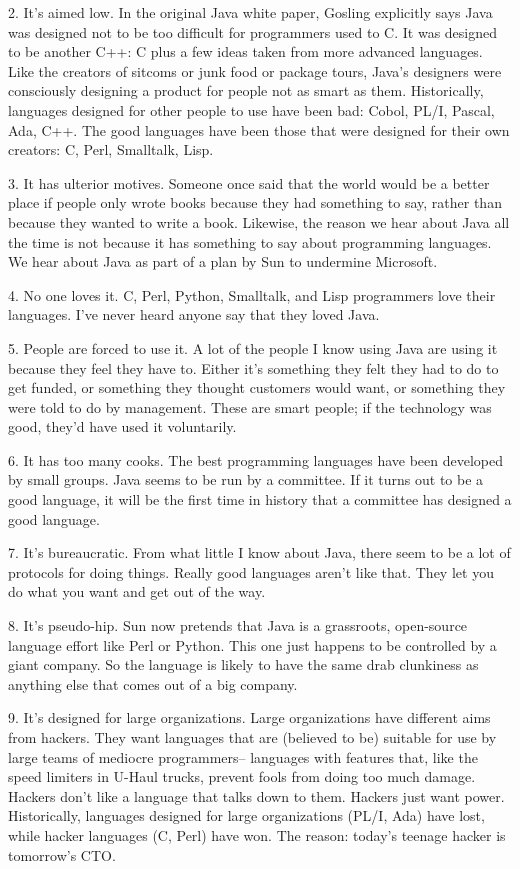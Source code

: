 2. It's aimed low. In the original Java white paper, Gosling explicitly
says Java was designed not to be too difficult for programmers used to
C. It was designed to be another C++: C plus a few ideas taken from more
advanced languages. Like the creators of sitcoms or junk food or package
tours, Java's designers were consciously designing a product for people
not as smart as them. Historically, languages designed for other people
to use have been bad: Cobol, PL/I, Pascal, Ada, C++. The good languages
have been those that were designed for their own creators: C, Perl,
Smalltalk, Lisp.

3. It has ulterior motives. Someone once said that the world would be a
better place if people only wrote books because they had something to
say, rather than because they wanted to write a book. Likewise, the
reason we hear about Java all the time is not because it has something
to say about programming languages. We hear about Java as part of a plan
by Sun to undermine Microsoft.

4. No one loves it. C, Perl, Python, Smalltalk, and Lisp programmers
love their languages. I've never heard anyone say that they loved Java.

5. People are forced to use it. A lot of the people I know using Java
are using it because they feel they have to. Either it's something they
felt they had to do to get funded, or something they thought customers
would want, or something they were told to do by management. These are
smart people; if the technology was good, they'd have used it
voluntarily.

6. It has too many cooks. The best programming languages have been
developed by small groups. Java seems to be run by a committee. If it
turns out to be a good language, it will be the first time in history
that a committee has designed a good language.

7. It's bureaucratic. From what little I know about Java, there seem to
be a lot of protocols for doing things. Really good languages aren't
like that. They let you do what you want and get out of the way.

8. It's pseudo-hip. Sun now pretends that Java is a grassroots,
open-source language effort like Perl or Python. This one just happens
to be controlled by a giant company. So the language is likely to have
the same drab clunkiness as anything else that comes out of a big
company.

9. It's designed for large organizations. Large organizations have
different aims from hackers. They want languages that are (believed to
be) suitable for use by large teams of mediocre programmers-- languages
with features that, like the speed limiters in U-Haul trucks, prevent
fools from doing too much damage. Hackers don't like a language that
talks down to them. Hackers just want power. Historically, languages
designed for large organizations (PL/I, Ada) have lost, while hacker
languages (C, Perl) have won. The reason: today's teenage hacker is
tomorrow's CTO.

